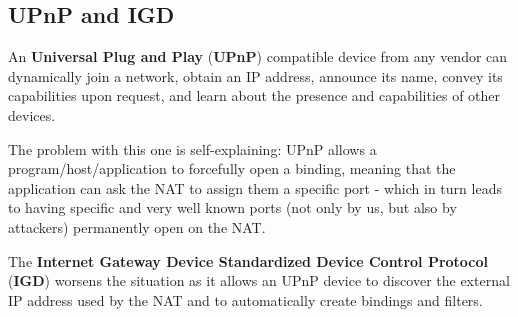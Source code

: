 
\subsection*{UPnP and IGD}
An \textbf{Universal Plug and Play} (\textbf{UPnP}) compatible device from any vendor can dynamically join a network, obtain an IP address, announce its name, convey its capabilities upon request, and learn about the presence and capabilities of other devices.

The problem with this one is self-explaining: UPnP allows a program/host/application to forcefully open a binding, meaning that the application can ask the NAT to assign them a specific port - which in turn leads to having specific and very well known ports (not only by us, but also by attackers) permanently open on the NAT.

The \textbf{Internet Gateway Device Standardized Device Control Protocol} (\textbf{IGD}) worsens the situation as it allows an UPnP device to discover the external IP address used by the NAT and to automatically create bindings and filters.